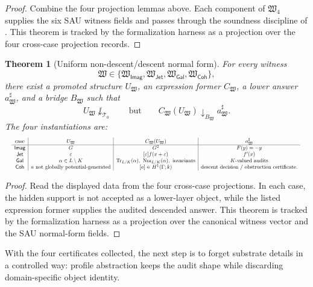 \documentclass[11pt]{article}
\newcommand{\Imag}{\mathsf{Imag}}
\newcommand{\Jet}{\mathsf{Jet}}
\newcommand{\Galois}{\mathsf{Gal}}
\newcommand{\Coh}{\mathsf{Coh}}
\newcommand{\Tr}{\operatorname{Tr}}
\newcommand{\Nm}{\operatorname{Nm}}
\newtheorem{theorem}{Theorem}[section]
\theoremstyle{definition}
\begin{document}
\begin{proof}
Combine the four projection lemmas above.  Each component of
\(\mathfrak W_4\) supplies the six SAU witness fields and passes through the
soundness discipline of .  This theorem is tracked
by the formalization harness as a projection over the four cross-case
projection records.
\end{proof}

\begin{theorem}[Uniform non-descent/descent normal form]
\label{thm:sau-uniform-normal-form}
For every witness
\[
\mathfrak W\in\{\mathfrak W_{\Imag},\mathfrak W_{\Jet},\mathfrak W_{\Galois},\mathfrak W_{\Coh}\},
\]
there exist a promoted structure \(U_{\mathfrak W}\), an expression former \(C_{\mathfrak W}\), a lower answer \(a^\sharp_{\mathfrak W}\), and a bridge \(B_{\mathfrak W}\) such that
\[
U_{\mathfrak W}\not\downarrow_{\mathcal T_0}
\qquad\text{but}\qquad
C_{\mathfrak W}(U_{\mathfrak W})\downarrow_{B_{\mathfrak W}} a^\sharp_{\mathfrak W}.
\]
The four instantiations are:
\[
\resizebox{\textwidth}{!}{\(
\begin{array}{c|c|c|c}
\text{case} & U_{\mathfrak W} & C_{\mathfrak W}(U_{\mathfrak W}) & a^\sharp_{\mathfrak W} \\
\hline
\Imag & G & G^2 & F(y)=-y \\
\Jet & \varepsilon & [\varepsilon]f(x+\varepsilon) & f'(x) \\
\Galois & \alpha\in L\setminus K & \Tr_{L/K}(\alpha),\ \Nm_{L/K}(\alpha),\ \text{invariants} & K\text{-valued audits} \\
\Coh & a\text{ not globally potential-generated} & [a]\in H^1(\Gamma;k) & \text{descent decision / obstruction certificate.}
\end{array}
\)
}
\]
\end{theorem}

\begin{proof}
Read the displayed data from the four cross-case projections.  In each case,
the hidden support is not accepted as a lower-layer object, while the listed
expression former supplies the audited descended answer.  This theorem is
tracked by the formalization harness as a projection over the canonical witness
vector and the SAU normal-form fields.
\end{proof}

With the four certificates collected, the next step is to forget substrate
details in a controlled way: profile abstraction keeps the audit shape while
discarding domain-specific object identity.
\end{document}
